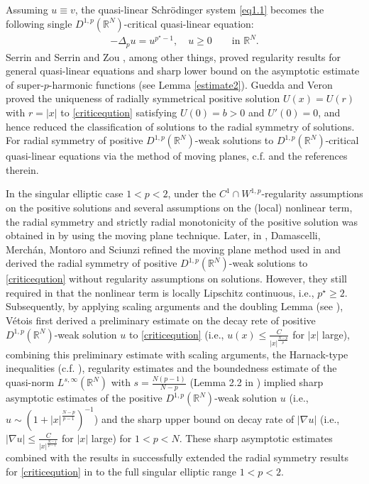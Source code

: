 \documentclass[12pt]{amsart}
\theoremstyle{definition}
\theoremstyle{remark}
\theoremstyle{conclusion}
\theoremstyle{conjecture}
\numberwithin{equation}{section}
\newcommand{\R}{\mathbb{R}}
\begin{document}
\smallskip


Assuming $u\equiv v$, the quasi-linear Schr\"{o}dinger system \eqref{eq1.1} becomes the following single $D^{1,p}(\mathbb{R}^{N})$-critical quasi-linear equation:
\begin{align}\label{criticeqution}
-\Delta_p u = u^{p^{\star}-1},\,\,\,\,\,\,u\geq0 \qquad \text{in} \,\, \mathbb{R}^{N}.
\end{align}
Serrin \cite{S} and Serrin and Zou \cite{SJZH02}, among other things, proved regularity results for general quasi-linear equations and sharp lower bound on the asymptotic estimate of super-$p$-harmonic functions (see Lemma \ref{estimate2}). Guedda and Veron \cite{GV} proved the uniqueness of radially symmetrical positive solution $U(x)=U(r)$ with $r=|x|$ to \eqref{criticeqution} satisfying $U(0)=b>0$ and $U'(0)=0$, and hence reduced the classification of solutions to the radial symmetry of solutions. For radial symmetry of positive $D^{1,p}(\R^N)$-weak solutions to $D^{1,p}(\mathbb{R}^{N})$-critical quasi-linear equations via the method of moving planes, c.f. \cite{CDL,CDGL,DLL,LD,DP,LDSMLMSB,DLPFRM,LDMR,LDBS04,LPLDHT,OSV,BS16,VJ16} and the references therein.

\smallskip

In the singular elliptic case $1<p<2$, under the $C^{1}\cap W^{1,p}$-regularity assumptions on the positive solutions and several assumptions on the (local) nonlinear term, the radial symmetry and strictly radial monotonicity of the positive solution was obtained in \cite{DLPFRM,LDMR} by using the moving plane technique. Later, in \cite{LDSMLMSB}, Damascelli, Merch\'{a}n, Montoro and Sciunzi refined the moving plane method used in \cite{DLPFRM,LDMR} and derived the radial symmetry of positive $D^{1,p}(\R^N)$-weak solutions to \eqref{criticeqution} without regularity assumptions on solutions. However, they still required in \cite{LDSMLMSB} that the nonlinear term is locally Lipschitz continuous, i.e., $p^{\star} \geq 2$. Subsequently, by applying scaling arguments and the doubling Lemma (see \cite{PPPQPS}), V\'{e}tois \cite{VJ16} first derived a preliminary estimate on the decay rete of positive $D^{1,p}(\R^N)$-weak solution $u$ to \eqref{criticeqution} (i.e., $u(x)\leq \frac{C}{|x|^{\frac{N-p}{p}}}$ for $|x|$ large), combining this preliminary estimate with scaling arguments, the Harnack-type inequalities (c.f. \cite{LDBS,JSLB}), regularity estimates and the boundedness estimate of the quasi-norm $L^{s,\infty}(\mathbb{R}^{N})$ with $s=\frac{N(p-1)}{N-p}$ (Lemma 2.2 in \cite{VJ16}) implied sharp asymptotic estimates of the positive $D^{1,p}(\R^N)$-weak solution $u$ (i.e., $u\sim\left(1+|x|^{\frac{N-p}{p-1}}\right)^{-1}$) and the sharp upper bound on decay rate of $|\nabla u|$ (i.e., $|\nabla u|\leq \frac{C}{|x|^{\frac{N-1}{p-1}}}$ for $|x|$ large) for $1<p<N$. These sharp asymptotic estimates combined with the results in \cite{DLPFRM,LDMR} successfully extended the radial symmetry results for \eqref{criticeqution} in \cite{LDSMLMSB} to the full singular elliptic range $1<p<2$.
\end{document}
